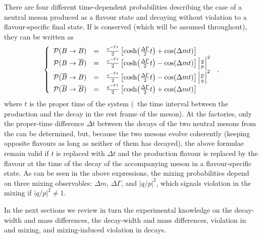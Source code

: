 There are four different time-dependent probabilities describing the 
case of a neutral \B meson produced as a flavour state and decaying without
\CP violation to a flavour-specific final state. 
If \CPT is conserved (which  
will be assumed throughout), they can be written as 
\begin{equation}
\left\{
\begin{array}{rcl}
{\cal P}(\B\to\B) & = &  \frac{e^{-\Gamma t}}{2} 
\left[ \cosh\!\left(\frac{\Delta\Gamma}{2}t\right) + \cos\!\left(\Delta m t\right)\right]  \\
{\cal P}(\B\to\bar{\B}) & = &  \frac{e^{-\Gamma t}}{2} 
\left[ \cosh\!\left(\frac{\Delta\Gamma}{2}t\right) - \cos\!\left(\Delta m t\right)\right] 
\left|\frac{q}{p}\right|^2 \\
{\cal P}(\bar{\B}\to\B) & = &  \frac{e^{-\Gamma t}}{2} 
\left[ \cosh\!\left(\frac{\Delta\Gamma}{2}t\right) - \cos\!\left(\Delta m t\right)\right] 
\left|\frac{p}{q}\right|^2 \\
{\cal P}(\bar{\B}\to\bar{\B}) & = &  \frac{e^{-\Gamma t}}{2} 
\left[ \cosh\!\left(\frac{\Delta\Gamma}{2}t\right) + \cos\!\left(\Delta m t\right)\right] 
\end{array} \right. \,,
\labe{oscillations}
\end{equation}
where $t$ is the proper time of the system (\ie\ the time interval between the production 
and the decay in the rest frame of the \B meson). 
At the \B factories, only the proper-time difference $\Delta t$ between the decays
of the two neutral \B mesons from the \Ups can be determined, but, 
because the two \B mesons evolve coherently (keeping opposite flavours as long
as neither of them has decayed), the 
above formulae remain valid 
if $t$ is replaced with $\Delta t$ and the production flavour is replaced by the flavour 
at the time of the decay of the accompanying \B meson in a flavour-specific state.
As can be seen in the above expressions,
the mixing probabilities 
depend on three mixing observables:
$\Delta m$, $\Delta\Gamma$,
and $|q/p|^2$, which signals \CP violation in the mixing if $|q/p|^2 \ne 1$.

In the next sections we review in turn the experimental knowledge
on the \Bd decay-width and mass differences, 
the \Bs decay-width and mass differences,  
\CP violation in \Bd and \Bs mixing, and mixing-induced \CP violation in \Bs decays. 

